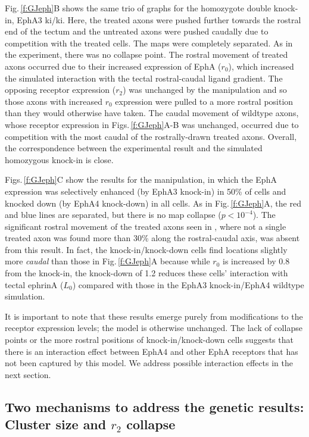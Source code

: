\documentclass[11pt, a4paper]{article}
\begin{document}
Fig.\,\ref{f:GJeph}B shows the same trio of graphs for the homozygote double knock-in, EphA3 ki/ki. Here, the treated axons were pushed further towards the rostral end of the tectum and the untreated axons were pushed caudally due to competition with the treated cells. 
The maps were completely separated. As in the experiment, there was no collapse point.
The rostral movement of treated axons occurred due to their increased expression of EphA ($r_0$), which increased the simulated interaction with the tectal rostral-caudal ligand gradient. 
The opposing receptor expression ($r_2$) was unchanged by the manipulation and so those axons with increased $r_0$ expression were pulled to a more rostral position than they would otherwise have taken. 
The caudal movement of wildtype axons, whose receptor expression in Figs.\,\ref{f:GJeph}A-B was unchanged, occurred due to competition with the most caudal of the rostrally-drawn treated axons.
Overall, the correspondence between the experimental result and the simulated homozygous knock-in is close.

Figs.\,\ref{f:GJeph}C show the results for the \citet{reber_relative_2004} manipulation, in which the EphA expression was selectively enhanced (by EphA3 knock-in) in 50\% of cells and knocked down (by EphA4 knock-down) in all cells.
As in Fig.\,\ref{f:GJeph}A, the red and blue lines are separated, but there is no map collapse ($p<10^{-4}$). 
The significant rostral movement of the treated axons seen in \citet{reber_relative_2004}, where not a single treated axon was found more than 30\% along the rostral-caudal axis, was absent from this result. 
In fact, the knock-in/knock-down cells find locations slightly more \emph{caudal} than those in Fig.\,\ref{f:GJeph}A because while $r_0$ is increased by 0.8 from the knock-in, the knock-down of 1.2 reduces these cells' interaction with tectal ephrinA ($L_0$) compared with those in the EphA3 knock-in/EphA4 wildtype simulation.

It is important to note that these results emerge purely from modifications to the receptor expression levels; the model is otherwise unchanged. 
The lack of collapse points or the more rostral positions of knock-in/knock-down cells suggests that there is an interaction effect between EphA4 and other EphA receptors that has not been captured by this model.
We address possible interaction effects in the next section.

\subsection*{Two mechanisms to address the genetic results: Cluster size and $r_2$ collapse}
\end{document}
